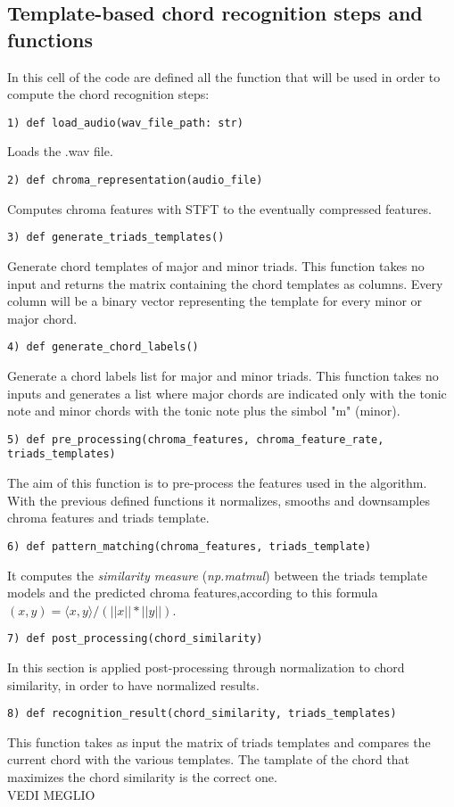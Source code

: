 \documentclass{article}
\begin{document}
\subsection{Template-based chord recognition steps and functions}
In this cell of the code are defined all the function that will be used in order to compute the chord recognition steps:
\begin{lstlisting}
1) def load_audio(wav_file_path: str)
\end{lstlisting}
Loads the .wav file.
\begin{lstlisting}
2) def chroma_representation(audio_file)
\end{lstlisting}
Computes chroma features with STFT to the eventually compressed features.
\begin{lstlisting}
3) def generate_triads_templates()
\end{lstlisting}
Generate chord templates of major and minor triads. This function takes no input and returns the matrix containing the chord templates as columns. 
Every column will be a binary vector representing the template for every minor or major chord.
\begin{lstlisting}
4) def generate_chord_labels()
\end{lstlisting}
Generate a chord labels list for major and minor triads.
This function takes no inputs and generates a list where major chords are indicated only with the tonic note and minor chords with the tonic note plus the simbol "m" (minor).
\begin{lstlisting}
5) def pre_processing(chroma_features, chroma_feature_rate, triads_templates)
\end{lstlisting}
The aim of this function is to pre-process the features used in the algorithm.
With the previous defined functions it normalizes, smooths and downsamples chroma features and triads template.
\begin{lstlisting}
6) def pattern_matching(chroma_features, triads_template)
\end{lstlisting}
It computes the \textit{similarity measure} (\textit{np.matmul}) between the triads template models and the predicted chroma features,according to this formula \begin{math}(x,y)=\langle x,y\rangle/(||x||*||y||)\end{math}.
 
\begin{lstlisting}
7) def post_processing(chord_similarity)
\end{lstlisting}
In this section is applied post-processing through normalization to chord similarity, in order to have normalized results.
\begin{lstlisting}
8) def recognition_result(chord_similarity, triads_templates)
\end{lstlisting}
This function takes as input the matrix of triads templates and compares the current chord with the various templates. The tamplate of the chord that maximizes the chord similarity is the correct one.\\
VEDI MEGLIO
\end{document}
